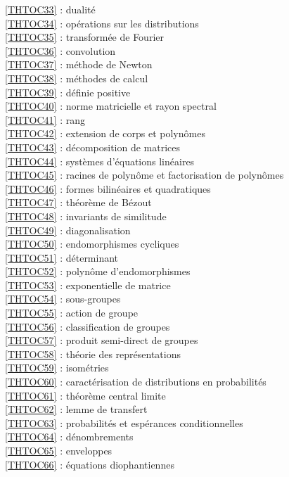 \ref {THTOC33} : dualité\\
\ref {THTOC34} : opérations sur les distributions\\
\ref {THTOC35} : transformée de Fourier\\
\ref {THTOC36} : convolution\\
\ref {THTOC37} : méthode de Newton\\
\ref {THTOC38} : méthodes de calcul\\
\ref {THTOC39} : définie positive\\
\ref {THTOC40} : norme matricielle et rayon spectral\\
\ref {THTOC41} : rang\\
\ref {THTOC42} : extension de corps et polynômes\\
\ref {THTOC43} : décomposition de matrices\\
\ref {THTOC44} : systèmes d'équations linéaires\\
\ref {THTOC45} : racines de polynôme et factorisation de polynômes\\
\ref {THTOC46} : formes bilinéaires et quadratiques\\
\ref {THTOC47} : théorème de Bézout\\
\ref {THTOC48} : invariants de similitude\\
\ref {THTOC49} : diagonalisation\\
\ref {THTOC50} : endomorphismes cycliques\\
\ref {THTOC51} : déterminant\\
\ref {THTOC52} : polynôme d'endomorphismes\\
\ref {THTOC53} : exponentielle de matrice\\
\ref {THTOC54} : sous-groupes\\
\ref {THTOC55} : action de groupe\\
\ref {THTOC56} : classification de groupes\\
\ref {THTOC57} : produit semi-direct de groupes\\
\ref {THTOC58} : théorie des représentations\\
\ref {THTOC59} : isométries\\
\ref {THTOC60} : caractérisation de distributions en probabilités\\
\ref {THTOC61} : théorème central limite\\
\ref {THTOC62} : lemme de transfert\\
\ref {THTOC63} : probabilités et espérances conditionnelles\\
\ref {THTOC64} : dénombrements\\
\ref {THTOC65} : enveloppes\\
\ref {THTOC66} : équations diophantiennes\\
